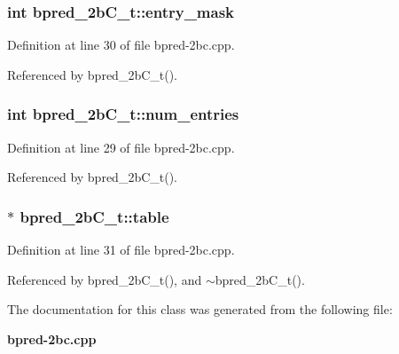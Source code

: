\subsubsection[{entry\_\-mask}]{\setlength{\rightskip}{0pt plus 5cm}int {\bf bpred\_\-2bC\_\-t::entry\_\-mask}\hspace{0.3cm}{\tt  [protected]}}\label{classbpred__2bC__t_b63dbbaa9d43776e273c26d425a9ec75}




Definition at line 30 of file bpred-2bc.cpp.

Referenced by bpred\_\-2bC\_\-t().
\subsubsection[{num\_\-entries}]{\setlength{\rightskip}{0pt plus 5cm}int {\bf bpred\_\-2bC\_\-t::num\_\-entries}\hspace{0.3cm}{\tt  [protected]}}\label{classbpred__2bC__t_22deb55a885c3a995597092e571a5492}




Definition at line 29 of file bpred-2bc.cpp.

Referenced by bpred\_\-2bC\_\-t().
\subsubsection[{table}]{$\ast$ {\bf bpred\_\-2bC\_\-t::table}\hspace{0.3cm}{\tt  [protected]}}\label{classbpred__2bC__t_fa00d50262820c0def89a63e26727e5d}




Definition at line 31 of file bpred-2bc.cpp.

Referenced by bpred\_\-2bC\_\-t(), and $\sim$bpred\_\-2bC\_\-t().

The documentation for this class was generated from the following file:\begin{CompactItemize}
\item 
{\bf bpred-2bc.cpp}\end{CompactItemize}

